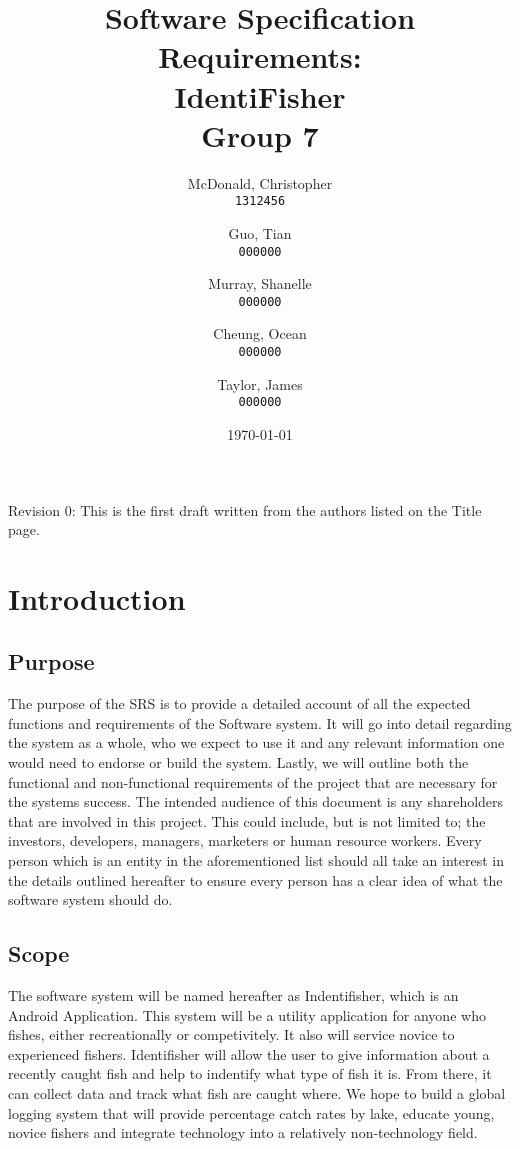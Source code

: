 \documentclass{article}
\title{Software Specification Requirements: \\ IdentiFisher \\ Group 7}
\author{
McDonald, Christopher\\
\texttt{1312456}
\and
Guo, Tian\\
\texttt{000000}
\and
Murray, Shanelle\\
\texttt{000000}
\and
Cheung, Ocean\\
\texttt{000000}
\and
Taylor, James\\
\texttt{000000}
}
\date{\today}
\begin{document}
\maketitle

\newpage

\tableofcontents

\vspace*{\fill}
Revision 0: This is the first draft written from the authors listed on the Title page.

\section{Introduction}

\subsection{Purpose}
The purpose of the SRS is to provide a detailed account of all the expected functions
and requirements of the Software system. It will go into detail regarding the system
as a whole, who we expect to use it and any relevant information one would need
to endorse or build the system. Lastly, we will outline both the functional and
non-functional requirements of the project that are necessary for the systems
success. The intended audience of this document is any shareholders that are involved in this
project. This could include, but is not limited to; the investors, developers, managers,
marketers or human resource workers. Every person which is an entity in the aforementioned
list should all take an interest in the details outlined hereafter to ensure every person
has a clear idea of what the software system should do.

\subsection{Scope}
The software system will be named hereafter as Indentifisher, which is an Android Application.
This system will be a utility application for anyone who fishes, either recreationally or
competivitely. It also will service novice to experienced fishers. Identifisher will allow
the user to give information about a recently caught fish and help to indentify what type
of fish it is. From there, it can collect data and track what fish are caught where. We
hope to build a global logging system that will provide percentage catch rates by lake,
educate young, novice fishers and integrate technology into a relatively non-technology field.
\end{document}
